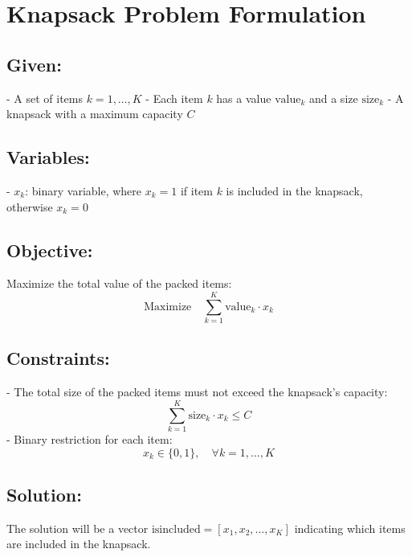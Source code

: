 \documentclass{article}
\begin{document}
\section*{Knapsack Problem Formulation}

\subsection*{Given:}
- A set of items \( k = 1, \ldots, K \)
- Each item \( k \) has a value \( \text{value}_k \) and a size \( \text{size}_k \)
- A knapsack with a maximum capacity \( C \)

\subsection*{Variables:}
- \( x_k \): binary variable, where \( x_k = 1 \) if item \( k \) is included in the knapsack, otherwise \( x_k = 0 \)

\subsection*{Objective:}
Maximize the total value of the packed items:
\[
\text{Maximize} \quad \sum_{k=1}^{K} \text{value}_k \cdot x_k
\]

\subsection*{Constraints:}
- The total size of the packed items must not exceed the knapsack's capacity:
\[
\sum_{k=1}^{K} \text{size}_k \cdot x_k \leq C
\]
- Binary restriction for each item:
\[
x_k \in \{0, 1\}, \quad \forall k = 1, \ldots, K
\]

\subsection*{Solution:}
The solution will be a vector \(\text{isincluded} = [x_1, x_2, \ldots, x_K]\) indicating which items are included in the knapsack.
\end{document}
